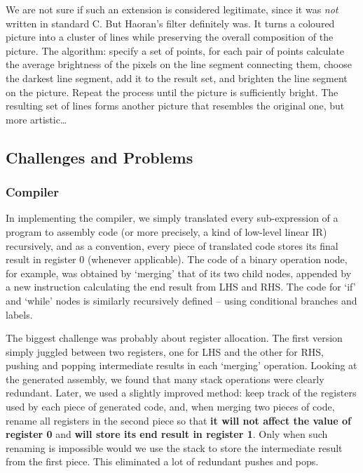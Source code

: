 \documentclass[11pt]{article}
\begin{document}
We are not sure if such an extension is considered legitimate, since it was \textit{not} written in standard C. But Haoran’s filter definitely was. It turns a coloured picture into a cluster of lines while preserving the overall composition of the picture. The algorithm: specify a set of points, for each pair of points calculate the average brightness of the pixels on the line segment connecting them, choose the darkest line segment, add it to the result set, and brighten the line segment on the picture. Repeat the process until the picture is sufficiently bright. The resulting set of lines forms another picture that resembles the original one, but more artistic…

\subsection{Challenges and Problems}

\subsubsection{Compiler}

In implementing the compiler, we simply translated every sub-expression of a program to assembly code (or more precisely, a kind of low-level linear IR) recursively, and as a convention, every piece of translated code stores its final result in register 0 (whenever applicable). The code of a binary operation node, for example, was obtained by ‘merging’ that of its two child nodes, appended by a new instruction calculating the end result from LHS and RHS. The code for ‘if’ and ‘while’ nodes is similarly recursively defined – using conditional branches and labels.

The biggest challenge was probably about register allocation. The first version simply juggled between two registers, one for LHS and the other for RHS, pushing and popping intermediate results in each ‘merging’ operation. Looking at the generated assembly, we found that many stack operations were clearly redundant. Later, we used a slightly improved method: keep track of the registers used by each piece of generated code, and, when merging two pieces of code, rename all registers in the second piece so that \textbf{it will not affect the value of register 0} and \textbf{will store its end result in register 1}. Only when such renaming is impossible would we use the stack to store the intermediate result from the first piece. This eliminated a lot of redundant pushes and pops.
\end{document}
